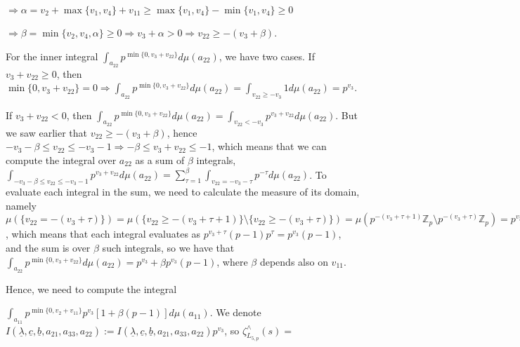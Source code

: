 \documentclass{article}
\begin{document}
$\Rightarrow{\alpha=v_{2}+\max\{v_{1},v_{4}\}+v_{11}\geq{\max\{v_{1},v_{4}\}-\min\{v_{1},v_{4}\}}}\geq{0}$

$\Rightarrow{\beta=\min\{v_{2},v_{4},\alpha\}}\geq{0}\Rightarrow{v_{3}+\alpha>0}\Rightarrow{v_{22}\geq{-(v_{3}+\beta)}}$. 

For the inner integral $\displaystyle\int_{a_{22}}p^{\min\{0,v_{3}+v_{22}\}}d\mu(a_{22})$, we have two cases. If $v_{3}+v_{22}\geq{0}$, then $\min\{0,v_{3}+v_{22}\}=0\Rightarrow{\displaystyle\int_{a_{22}}p^{\min\{0,v_{3}+v_{22}\}}d\mu(a_{22})}=\displaystyle\int_{v_{22}\geq{-v_{3}}}1d\mu(a_{22})=p^{v_{3}}$. 

If $v_{3}+v_{22}<0$, then $\displaystyle\int_{a_{22}}p^{\min\{0,v_{3}+v_{22}\}}d\mu(a_{22})=\displaystyle\int_{v_{22}<-v_{3}}p^{v_{3}+v_{22}}d\mu(a_{22})$. But we saw earlier that $v_{22}\geq{-(v_{3}+\beta)}$, hence $-v_{3}-\beta\leq{v_{22}}\leq{-v_{3}-1}\Rightarrow{-\beta\leq{v_{3}+v_{22}}\leq{-1}}$, which means that we can compute the integral over $a_{22}$ as a sum of $\beta$ integrals, $\displaystyle\int_{-v_{3}-\beta\leq{v_{22}}\leq{-v_{3}-1}}p^{v_{3}+v_{22}}d\mu(a_{22})=\sum_{\tau=1}^{\beta}\displaystyle\int_{v_{22}=-v_{3}-\tau}p^{-\tau}d\mu(a_{22})$. To evaluate each integral in the sum, we need to calculate the measure of its domain, namely $\mu(\{v_{22}=-(v_{3}+\tau)\})=\mu(\{v_{22}\geq{-(v_{3}+\tau+1)}\}\setminus{\{v_{22}\geq{-(v_{3}+\tau)}\}})=\mu(p^{-(v_{3}+\tau+1)}\mathbb{Z}_{p}\setminus{p^{-(v_{3}+\tau)}\mathbb{Z}_{p}})=p^{v_{3}+\tau+1}-p^{v_{3}+\tau}=p^{v_{3}+\tau}(p-1)$, which means that each integral evaluates as $p^{v_{3}+\tau}(p-1)p^{\tau}=p^{v_{3}}(p-1)$, and the sum is over $\beta$ such integrals, so we have that $\displaystyle\int_{a_{22}}p^{\min\{0,v_{3}+v_{22}\}}d\mu(a_{22})=p^{v_{3}}+\beta{p^{v_{3}}(p-1)}$, where $\beta$ depends also on $v_{11}$.

Hence, we need to compute the integral 

$\displaystyle\int_{a_{11}}p^{\min\{0,v_{2}+v_{11}\}}p^{v_{3}}[1+\beta(p-1)]d\mu(a_{11})$. We denote $I(\underline{\lambda},\underline{c},\underline{b},a_{21},a_{33},a_{22}):=I(\underline{\lambda},\underline{c},\underline{b},a_{21},a_{33},a_{22})p^{v_{3}}$, so $\zeta_{L_{5,p}}^{\wedge}(s)=$
\end{document}
